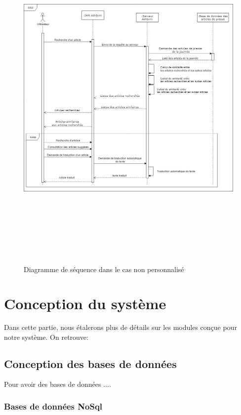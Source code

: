 \begin{figure}[H]
	\centering
	\includegraphics[height=500pt,width=450pt]{img/chapter3/diag_seq_nonpers.jpg}
	\caption{Diagramme de séquence dans le cas non personnalisé}
\end{figure}

\section{Conception du système}
Dans cette partie, nous étalerons plus de détails sur les modules conçue pour notre système.
On retrouve:


\subsection{Conception des bases de données}
Pour avoir des bases de données ....

\subsubsection{Bases de données NoSql}


